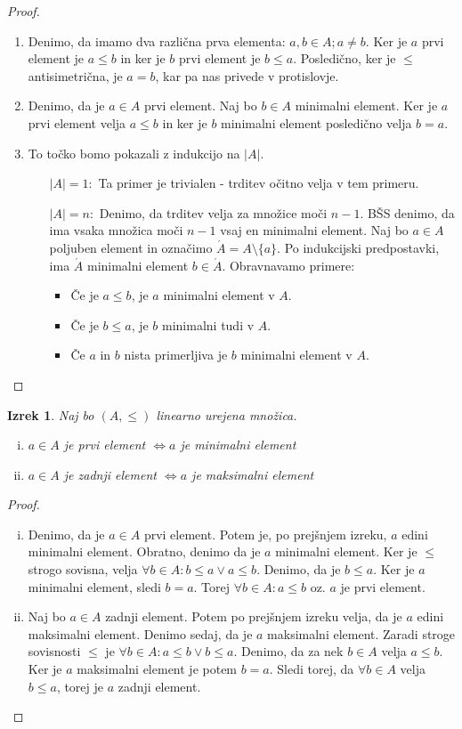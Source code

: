 \documentclass[a4paper, 10pt]{article}
\newtheorem{izr}{Izrek}
\newcommand{\abs}[1]{\ensuremath{\lvert #1 \rvert}}
\begin{document}
	\begin{proof}
		\begin{enumerate}
			\item Denimo, da imamo dva različna prva elementa: $a, b\in A; a\neq b$. Ker je $a$ prvi element je $a\leq b$ in ker je $b$ prvi element je $b \leq a$. Posledično, ker je $\leq$ antisimetrična, je $a = b$, kar pa nas privede v protislovje.
			\item Denimo, da je $a\in A$ prvi element. Naj bo $b\in A$ minimalni element. Ker je $a$ prvi element velja $a\leq b$ in ker je $b$ minimalni element posledično velja $b = a$.
			\item To točko bomo pokazali z indukcijo na $\abs{A}$. \begin{itemize}
				\item[\abs{A}$=1:$] Ta primer je trivialen - trditev očitno velja v tem primeru.
				\item[\abs{A}$=n:$] Denimo, da trditev velja za množice moči $n-1$. BŠS denimo, da ima vsaka množica moči $n-1$ vsaj en minimalni element. Naj bo $a\in A$ poljuben element in označimo $\acute{A} = A\setminus\{a\}$. Po indukcijski predpostavki, ima $\acute{A}$ minimalni element $b\in \acute{A}$. Obravnavamo primere: \begin{itemize}
					\item Če je $a\leq b$, je $a$ minimalni element v $A$.
					\item Če je $b\leq a$, je $b$ minimalni tudi v $A$.
					\item Če $a$ in $b$ nista primerljiva je $b$ minimalni element v $A$.
				\end{itemize}
			\end{itemize}
		\end{enumerate}
	\end{proof}
	\begin{izr}
		Naj bo $(A, \leq)$ linearno urejena množica. \begin{enumerate}[i)]
			\item $a\in A$ je prvi element $\iff a$ je minimalni element
			\item $a\in A$ je zadnji element $\iff a$ je maksimalni element
		\end{enumerate}
	\end{izr}
	\begin{proof}
		\begin{enumerate}[i)]
			\item Denimo, da je $a\in A$ prvi element. Potem je, po prejšnjem izreku, $a$ edini minimalni element. Obratno, denimo da je $a$ minimalni element. Ker je $\leq$ strogo sovisna, velja $\forall b\in A: b\leq a \lor a\leq b$. Denimo, da je $b\leq a$. Ker je $a$ minimalni element, sledi $b = a$. Torej $\forall b\in A: a\leq b$ oz. $a$ je prvi element.
			\item Naj bo $a\in A$ zadnji element. Potem po prejšnjem izreku velja, da je $a$ edini maksimalni element. Denimo sedaj, da je $a$ maksimalni element. Zaradi stroge sovisnosti $\leq$ je $\forall b\in A: a\leq b \lor b\leq a$. Denimo, da za nek $b\in A$ velja $a\leq b$. Ker je $a$ maksimalni element je potem $b = a$. Sledi torej, da $\forall b\in A$ velja $b\leq a$, torej je $a$ zadnji element.
		\end{enumerate}
	\end{proof}
\end{document}
